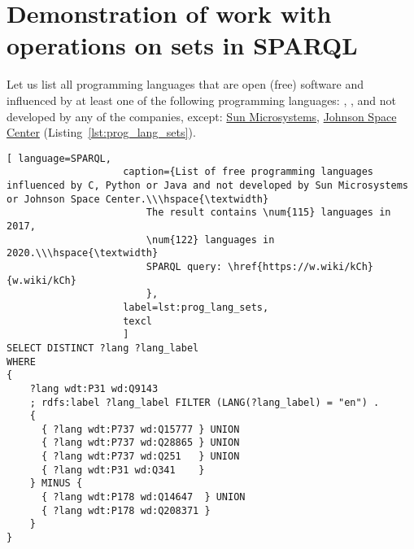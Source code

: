\label{question:prog_lang_1}

\section{Demonstration of work with operations on sets in SPARQL}

Let us list all programming languages that are open (free) software and influenced by at least one of the following programming languages: , ,  and not developed by any of the companies, except: \href{https://en.wikipedia.org/wiki/Sun_Microsystems}{Sun Microsystems}, \href{https://en.wikipedia.org/wiki/Johnson_Space_Center}{Johnson Space Center} (Listing~\ref{lst:prog_lang_sets}).
\begin{lstlisting}[ language=SPARQL, 
                    caption={List of free programming languages influenced by C, Python or Java and not developed by Sun Microsystems or Johnson Space Center.\\\hspace{\textwidth}
                        The result contains \num{115} languages in 2017, 
                        \num{122} languages in 2020.\\\hspace{\textwidth}
                        SPARQL query: \href{https://w.wiki/kCh}{w.wiki/kCh}
                        },
                    label=lst:prog_lang_sets,
                    texcl 
                    ]
SELECT DISTINCT ?lang ?lang_label
WHERE
{
    ?lang wdt:P31 wd:Q9143
    ; rdfs:label ?lang_label FILTER (LANG(?lang_label) = "en") . 
    {
      { ?lang wdt:P737 wd:Q15777 } UNION
      { ?lang wdt:P737 wd:Q28865 } UNION 
      { ?lang wdt:P737 wd:Q251   } UNION
      { ?lang wdt:P31 wd:Q341    }
    } MINUS { 
      { ?lang wdt:P178 wd:Q14647  } UNION
      { ?lang wdt:P178 wd:Q208371 }
    }   
}
\end{lstlisting}%

